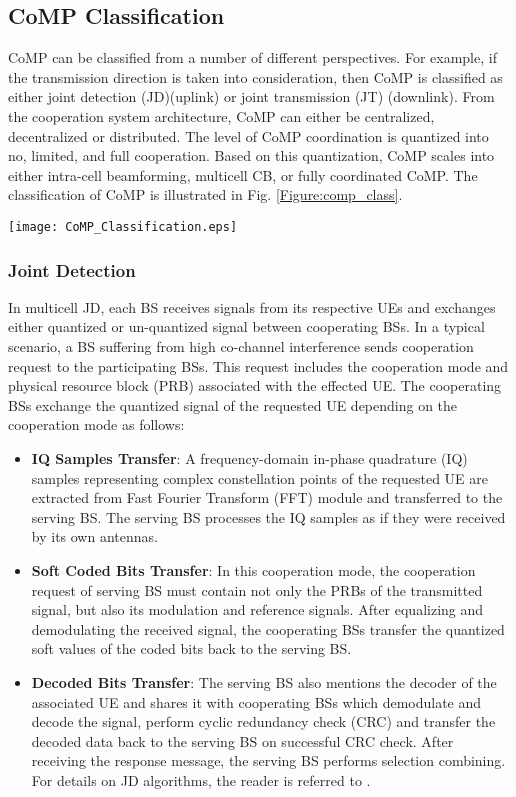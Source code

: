 \documentclass[article,10pt,twocolumn]{IEEEtran}
\begin{document}
\subsection{CoMP Classification}\label{comp_classification}
CoMP can be classified from a number of different perspectives. For example, if the transmission direction is taken into consideration, then CoMP is classified as either joint detection (JD)(uplink) or joint transmission (JT) (downlink). From the cooperation system architecture, CoMP can either be centralized, decentralized or distributed. The level of CoMP coordination is quantized into no, limited, and full cooperation. Based on this quantization, CoMP scales into either intra-cell beamforming, multicell CB, or fully coordinated CoMP. The classification of CoMP is illustrated in Fig. \ref{Figure:comp_class}.
\begin{figure*}[!htb]
\centering
  \texttt{[image: CoMP\_Classification.eps]}
 \caption{CoMP Classification}\label{Figure:comp_class}
\vspace{-4mm}
\end{figure*}
\subsubsection{Joint Detection}\label{joint_detection}
In multicell JD, each BS receives signals from its respective UEs and exchanges either quantized or un-quantized signal between cooperating BSs. In a typical scenario, a BS suffering from high co-channel interference sends cooperation request to the participating BSs. This request includes the cooperation mode and physical resource block (PRB) associated with the effected UE. The cooperating BSs exchange the quantized signal of the requested UE depending on the cooperation mode as follows:
\begin{itemize}
  \item \textbf{IQ Samples Transfer}:    A frequency-domain in-phase quadrature (IQ) samples representing complex constellation points of  the requested UE are extracted from Fast Fourier Transform (FFT) module and transferred to the serving BS. The serving BS processes the IQ samples as if they were received by its own antennas.
  \item \textbf{Soft Coded Bits Transfer}:    In this cooperation mode, the cooperation request of serving BS must contain not only the PRBs of the transmitted signal, but also its modulation and reference signals. After equalizing and demodulating the received signal, the cooperating BSs transfer the quantized soft values of the coded bits back to the serving BS.
  \item \textbf{Decoded Bits Transfer}:    The serving BS also mentions the decoder of the associated UE and shares it with cooperating BSs which demodulate and decode the signal, perform cyclic redundancy check (CRC) and transfer the decoded data back to the serving BS on successful CRC check. After receiving the response message, the serving BS performs selection combining. For details on JD algorithms, the reader is referred to \citep{1194444, 738086, 774855, 1271237}.
\end{itemize}
\end{document}
